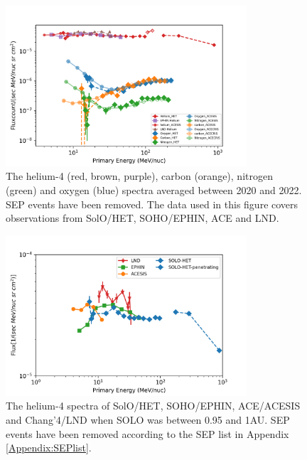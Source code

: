 \begin{figure}[!htb]
    \centering
    \includegraphics[width = 0.8\textwidth]{images/ACR/ACE_SIS_CRIS_SOLO_all_3.png}
    \caption[The quite time spactra of helium, carbon, nitrogen and oxygen between 2020 and 2022]{The helium-4 (red, brown, purple), carbon (orange), nitrogen (green) and oxygen (blue) spectra averaged between 2020 and 2022. \ac{SEP} events have been removed. The data used in this figure covers observations from \ac{SolO}/\ac{HET}, \ac{SOHO}/\ac{EPHIN}, \ac{ACE} and \ac{LND}.}
    \label{fig:overview}
\end{figure}
\begin{figure}[!htb]
    \centering
    \includegraphics[width = 0.8\textwidth]{images/ACR/1AU_comparison_ACE_EPHIN_SOLO_SEP_version2.png}
    \caption[The helium spectra when \ac{SolO} was between 0.95 and 1 au]{The helium-4 spectra of \ac{SolO}/\ac{HET}, \ac{SOHO}/\ac{EPHIN}, \ac{ACE}/\ac{ACESIS} and Chang'4/\ac{LND} when SOLO was between 0.95 and 1AU. \ac{SEP} events have been removed according to the \ac{SEP} list in Appendix \ref{Appendix:SEPlist}.}
    \label{fig:helium_spec_1au}
\end{figure}

